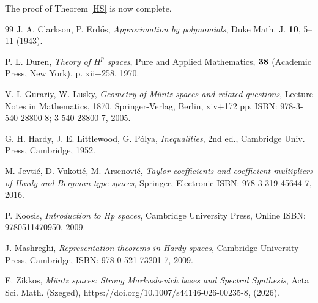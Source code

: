 \documentclass[11pt, a4paper]{article}
\begin{document}
The proof of Theorem \ref{HS} is now complete.


\begin{thebibliography}{99}
 J. A. Clarkson, P. Erd\H{o}s,
\textit{Approximation by polynomials},
Duke Math. J. \textbf{10}, 5--11 (1943).

 P. L. Duren,
\textit{Theory of $H^p$ spaces},
Pure and Applied Mathematics, $\bf 38$ (Academic Press, New York), p. xii+258, 1970.

 V. I. Gurariy, W. Lusky,
\textit{Geometry of M\"{u}ntz spaces and related questions},
Lecture Notes in Mathematics, 1870.
Springer-Verlag, Berlin, xiv+172 pp.
ISBN: 978-3-540-28800-8; 3-540-28800-7, 2005.

 G. H. Hardy, J. E. Littlewood, G. P\'{o}lya,
\textit{Inequalities},
2nd ed., Cambridge Univ. Press, Cambridge, 1952.

 M. Jevti\'{c}, D. Vukoti\'{c}, M. Arsenovi\'{c},
\textit{Taylor coefficients and coefficient multipliers of Hardy and Bergman-type spaces},
Springer, Electronic ISBN: 978-3-319-45644-7, 2016.

 P. Koosis,
\textit{Introduction to Hp spaces},
Cambridge University Press,
Online ISBN: 9780511470950, 2009.

  J. Mashreghi,
\textit{Representation theorems in Hardy spaces},
Cambridge University Press, Cambridge,
ISBN: 978-0-521-73201-7, 2009.

 E. Zikkos,
\textit{M\"{u}ntz spaces: Strong Markushevich bases and Spectral Synthesis},
Acta Sci. Math. (Szeged), https://doi.org/10.1007/s44146-026-00235-8, (2026).

\end{thebibliography}

%
%
\end{document}
